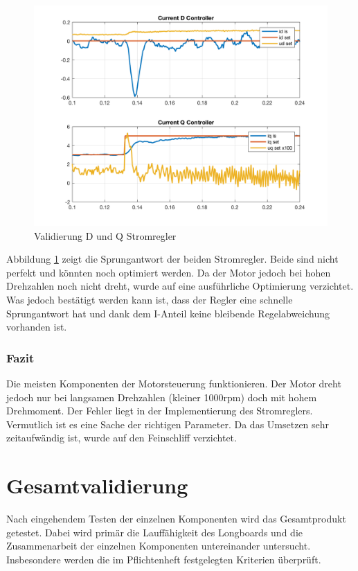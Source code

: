\begin{figure} [H]
	\centering
	\includegraphics[width=0.8\linewidth]{images/valmccontrollers.png}
	\caption{Validierung D und Q Stromregler}
	\label{fig:reg}
\end{figure}

Abbildung \ref{fig:reg} zeigt die Sprungantwort der beiden Stromregler. Beide sind nicht perfekt und könnten noch optimiert werden. Da der Motor jedoch bei hohen Drehzahlen noch nicht dreht, wurde auf eine ausführliche Optimierung verzichtet. Was jedoch bestätigt werden kann ist, dass der Regler eine schnelle Sprungantwort hat und dank dem I-Anteil keine bleibende Regelabweichung vorhanden ist.


\subsubsection*{Fazit}
Die meisten Komponenten der Motorsteuerung funktionieren. Der Motor dreht jedoch nur bei langsamen Drehzahlen (kleiner 1000rpm) doch mit hohem Drehmoment. Der Fehler liegt in der Implementierung des Stromreglers. Vermutlich ist es eine Sache der richtigen Parameter. Da das Umsetzen sehr zeitaufwändig ist, wurde auf den Feinschliff verzichtet.


\section{Gesamtvalidierung} \label{ValidGesamtv}
Nach eingehendem Testen der einzelnen Komponenten wird das Gesamtprodukt getestet. Dabei wird primär die Lauffähigkeit des Longboards und die Zusammenarbeit der einzelnen Komponenten untereinander untersucht. Insbesondere werden die im Pflichtenheft festgelegten Kriterien überprüft.

